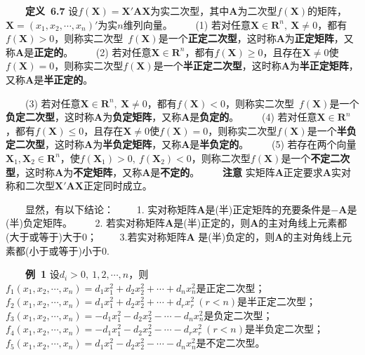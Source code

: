 \documentclass[compress,mathserif,cjk]{beamer}
\theoremstyle{remark}
\numberwithin{equation}{section}
\newcommand{\hei}{\bf}      %
\begin{document}
\begin{CJK}{UTF8}{gbsn}
\begin{frame}
\ \ \ \ {\hei 定义~6.7} 设$f(\bm X)=\bm X'\bm{AX}$为实二次型，其中$\bm A$为二次型$f(\bm X)$的矩阵，$\bm X=(x_1,x_2,\cdots,x_n)'$为实$n$维列向量。
\vskip 5pt
\ \ \ \ (1) 若对任意$\bm X\in\mathbf R^n,~\bm X\neq0$，都有$f(\bm X)>0$，则称实二次型~$f(\bm X)$是一个{\hei 正定二次型}，这时称$\bm A$为{\hei 正定矩阵}，又称$\bm A$是{\hei 正定的}。
\pause\vskip 5pt
\ \ \ \ (2) 若对任意$\bm X\in\mathbf R^n$，都有$f(\bm X)\geq0$，且存在$\bm X\neq0$使$f(\bm X)=0$，则称实二次型$f(\bm X)$是一个{\hei 半正定二次型}，这时称$\bm A$为{\hei 半正定矩阵}，又称$\bm A$是{\hei 半正定的}。
\end{frame}
\begin{frame}
\ \ \ \ (3) 若对任意$\bm X\in\mathbf R^n,~\bm X\neq0$，都有$f(\bm X)<0$，则称实二次型~$f(\bm X)$是一个{\hei 负定二次型}，这时称$\bm A$为{\hei 负定矩阵}，又称$\bm A$是{\hei 负定的}。
\pause\vskip 5pt
\ \ \ \ (4) 若对任意$\bm X\in\mathbf R^n$，都有$f(\bm X)\leq0$，且存在$\bm X\neq0$使$f(\bm X)=0$，则称实二次型$f(\bm X)$是一个{\hei 半负定二次型}，这时称$\bm A$为{\hei 半负定矩阵}，又称$\bm A$是{\hei 半负定的}。
\pause\vskip 5pt
\ \ \ \ (5) 若存在两个向量$\bm X_1,\bm X_2\in\mathbf R^n$，使$f(\bm X_1)>0,~f(\bm X_2)<0$，则称二次型$f(\bm X)$是一个{\hei 不定二次型}，这时称$\bm A$为{\hei 不定矩阵}，又称$\bm A$是{\hei 不定的}。
\pause\vskip 5pt
\ \ \ \ {\hei 注意} 实矩阵$\bm A$正定要求$\bm A$实对称和二次型$\bm X'\bm{AX}$正定同时成立。
\end{frame}
\begin{frame}
\ \ \ \ 显然，有以下结论：
\vskip 5pt
\ \ \ \ 1. 实对称矩阵$\bm A$是(半)正定矩阵的充要条件是$-\bm A$是(半)负定矩阵。
\vskip 5pt
\ \ \ \ 2. 若实对称矩阵$\bm A$是(半)正定的，则$\bm A$的主对角线上元素都(大于或等于)大于0；
\vskip 5pt
\ \ \ \ 3.若实对称矩阵$\bm A$ 是(半)负定的，则$\bm A$的主对角线上元素都(小于或等于)小于0.
\end{frame}
\begin{frame}
\ \ \ \ {\hei 例~1} 设$d_i>0,~1,2,\cdots,n$，则
\vskip 5pt
\ \ \ \ $f_1(x_1,x_2,\cdots,x_n)=d_1x_1^2+d_2x_2^2+\cdots+d_nx_n^2$是正定二次型；
\pause\vskip 5pt
\ \ \ \ $f_2(x_1,x_2,\cdots,x_n)=d_1x_1^2+d_2x_2^2+\cdots+d_rx_r^2~(r<n)$是半正定二次型；
\pause\vskip 5pt
\ \ \ \ $f_3(x_1,x_2,\cdots,x_n)=-d_1x_1^2-d_2x_2^2-\cdots-d_nx_n^2$是负定二次型；
\pause\vskip 5pt
\ \ \ \ $f_4(x_1,x_2,\cdots,x_n)=-d_1x_1^2-d_2x_2^2-\cdots-d_rx_r^2~(r<n)$是半负定二次型；
\pause\vskip 5pt
\ \ \ \ $f_5(x_1,x_2,\cdots,x_n)=d_1x_1^2-d_2x_2^2-\cdots-d_nx_n^2$是不定二次型。
\end{frame}

\end{CJK}
\end{document}
